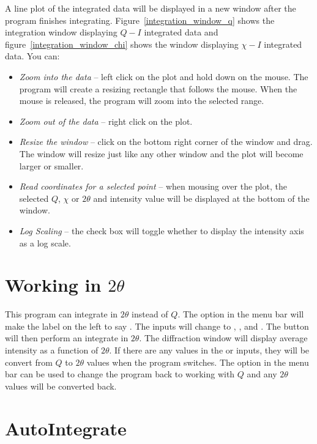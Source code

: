 A line plot
of the integrated data will be displayed in a new window
after the program finishes integrating. 
Figure~\ref{integration_window_q} shows 
the integration window displaying $Q-I$ integrated data
and figure~\ref{integration_window_chi} shows the
window displaying $\chi-I$ integrated data.
You can:
\begin{itemize}
    \item {\em Zoom into the data} -- left click on the plot and 
    hold down on the mouse. The program will create a resizing 
    rectangle that follows the mouse. When the mouse is 
    released, the program will zoom into the selected range.
    \item {\em Zoom out of the data} -- right
    click on the plot.
    \item {\em Resize the window} -- click on the bottom right 
    corner of the window and drag. The window will resize just 
    like any other window and the plot will become larger or 
    smaller.  
    \item {\em Read coordinates for a selected point} --
    when mousing over the plot, the selected $Q$, $\chi$
    or $2\theta$ and intensity value will be displayed at
    the bottom of the window.
    \item {\em Log Scaling} -- the  check box
    will toggle whether to display the intensity axis as
    a log scale.
\end{itemize}

\section{\texorpdfstring{Working in $2\theta$}{Working in 2theta}}

This program can integrate in $2\theta$ instead of $Q$. 
The  option in the menu bar will
make the label on the left to say 
. The inputs will 
change to , , 
and . The 
 button will then perform an integrate 
in $2\theta$. The diffraction window will display
average intensity as a function of $2\theta$.
If there are any values in the  or
 inputs, they will be convert from $Q$ to $2\theta$
values when the program switches. The  option
in the menu bar can be used to change the program 
back to working with $Q$ and any $2\theta$ values will
be converted back.

\section{AutoIntegrate}

